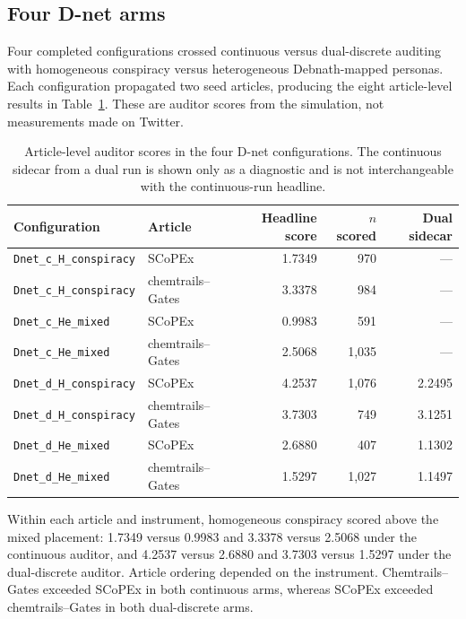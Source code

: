 \subsection{Four D-net arms}

Four completed configurations crossed continuous versus dual-discrete
auditing with homogeneous conspiracy versus heterogeneous Debnath-mapped
personas.  Each configuration propagated two seed articles, producing the
eight article-level results in Table~\ref{tab:dnet-arms}.  These are
auditor scores from the simulation, not measurements made on Twitter.

\begin{table}[htbp]
\centering
\caption{Article-level auditor scores in the four D-net configurations.
The continuous sidecar from a dual run is shown only as a diagnostic and is
not interchangeable with the continuous-run headline.}
\label{tab:dnet-arms}
\small
\begin{tabular}{llrrr}
\toprule
Configuration & Article & Headline score & $n$ scored & Dual sidecar \\
\midrule
\texttt{Dnet\_c\_H\_conspiracy}
  & SCoPEx & 1.7349 & 970 & --- \\
\texttt{Dnet\_c\_H\_conspiracy}
  & chemtrails--Gates & 3.3378 & 984 & --- \\
\texttt{Dnet\_c\_He\_mixed}
  & SCoPEx & 0.9983 & 591 & --- \\
\texttt{Dnet\_c\_He\_mixed}
  & chemtrails--Gates & 2.5068 & 1,035 & --- \\
\texttt{Dnet\_d\_H\_conspiracy}
  & SCoPEx & 4.2537 & 1,076 & 2.2495 \\
\texttt{Dnet\_d\_H\_conspiracy}
  & chemtrails--Gates & 3.7303 & 749 & 3.1251 \\
\texttt{Dnet\_d\_He\_mixed}
  & SCoPEx & 2.6880 & 407 & 1.1302 \\
\texttt{Dnet\_d\_He\_mixed}
  & chemtrails--Gates & 1.5297 & 1,027 & 1.1497 \\
\bottomrule
\end{tabular}
\end{table}

Within each article and instrument, homogeneous conspiracy scored above the
mixed placement: 1.7349 versus 0.9983 and 3.3378 versus 2.5068 under the
continuous auditor, and 4.2537 versus 2.6880 and 3.7303 versus 1.5297 under
the dual-discrete auditor.  Article ordering depended on the instrument.
Chemtrails--Gates exceeded SCoPEx in both continuous arms, whereas SCoPEx
exceeded chemtrails--Gates in both dual-discrete arms.

